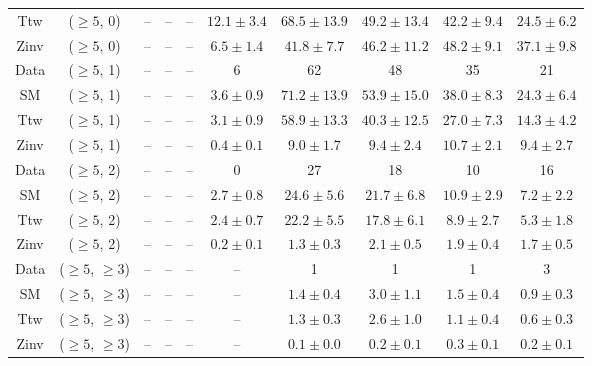 \begin{table}[h!]
{\begin{tabular}{cccccccccc}
	Ttw & ($\ge5$, 0) & -- & -- & -- & $12.1\pm 3.4$ & $68.5\pm 13.9$ & $49.2\pm 13.4$ & $42.2\pm 9.4$ & $24.5\pm 6.2$ \\[0.5ex] 
	Zinv & ($\ge5$, 0) & -- & -- & -- & $6.5\pm 1.4$ & $41.8\pm 7.7$ & $46.2\pm 11.2$ & $48.2\pm 9.1$ & $37.1\pm 9.8$ \\[0.5ex] 
	Data & ($\ge5$, 1) & -- & -- & -- & 6 & 62 & 48 & 35 & 21 \\[0.5ex] 
	SM & ($\ge5$, 1) & -- & -- & -- & $3.6\pm 0.9$ & $71.2\pm 13.9$ & $53.9\pm 15.0$ & $38.0\pm 8.3$ & $24.3\pm 6.4$ \\[0.5ex] 
	Ttw & ($\ge5$, 1) & -- & -- & -- & $3.1\pm 0.9$ & $58.9\pm 13.3$ & $40.3\pm 12.5$ & $27.0\pm 7.3$ & $14.3\pm 4.2$ \\[0.5ex] 
	Zinv & ($\ge5$, 1) & -- & -- & -- & $0.4\pm 0.1$ & $9.0\pm 1.7$ & $9.4\pm 2.4$ & $10.7\pm 2.1$ & $9.4\pm 2.7$ \\[0.5ex] 
	Data & ($\ge5$, 2) & -- & -- & -- & 0 & 27 & 18 & 10 & 16 \\[0.5ex] 
	SM & ($\ge5$, 2) & -- & -- & -- & $2.7\pm 0.8$ & $24.6\pm 5.6$ & $21.7\pm 6.8$ & $10.9\pm 2.9$ & $7.2\pm 2.2$ \\[0.5ex] 
	Ttw & ($\ge5$, 2) & -- & -- & -- & $2.4\pm 0.7$ & $22.2\pm 5.5$ & $17.8\pm 6.1$ & $8.9\pm 2.7$ & $5.3\pm 1.8$ \\[0.5ex] 
	Zinv & ($\ge5$, 2) & -- & -- & -- & $0.2\pm 0.1$ & $1.3\pm 0.3$ & $2.1\pm 0.5$ & $1.9\pm 0.4$ & $1.7\pm 0.5$ \\[0.5ex] 
	Data & ($\ge5$, $\ge3$) & -- & -- & -- & -- & 1 & 1 & 1 & 3 \\[0.5ex] 
	SM & ($\ge5$, $\ge3$) & -- & -- & -- & -- & $1.4\pm 0.4$ & $3.0\pm 1.1$ & $1.5\pm 0.4$ & $0.9\pm 0.3$ \\[0.5ex] 
	Ttw & ($\ge5$, $\ge3$) & -- & -- & -- & -- & $1.3\pm 0.3$ & $2.6\pm 1.0$ & $1.1\pm 0.4$ & $0.6\pm 0.3$ \\[0.5ex] 
	Zinv & ($\ge5$, $\ge3$) & -- & -- & -- & -- & $0.1\pm 0.0$ & $0.2\pm 0.1$ & $0.3\pm 0.1$ & $0.2\pm 0.1$ \\[0.5ex] 
	\hline
	\hline
\end{tabular}}
\end{table}
